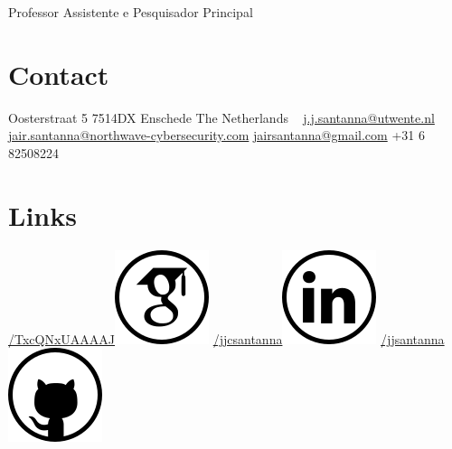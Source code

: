 \documentclass[print]{styles/friggeri-cv-mac} %
\begin{document}
{Professor Assistente e Pesquisador Principal} 
\begin{aside} 
 \section{Contact}
 Oosterstraat 5
 7514DX Enschede
 The Netherlands
~
\href{mailto:j.j.santanna@utwente.nl}{j.j.santanna@utwente.nl}
\href{mailto:jair.santanna@northwave-cybersecurity.com}{jair.santanna@northwave-cybersecurity.com}
\href{mailto:jairsantanna@gmail.com}{jairsantanna@gmail.com}
+31 6 82508224
~
\section{Links}\hspace{-1cm}
\hspace{-0.5cm}
\href{https://scholar.google.com/citations?user=TxcQNxUAAAAJ}{/TxcQNxUAAAAJ}\includegraphics[scale=0.3]{img/googlescholar.png}
\href{https://www.linkedin.com/in/jjcsantanna}{/jjcsantanna}\includegraphics[scale=0.3]{img/linkedin.png}
\href{https://github.com/jjsantanna}{/jjsantanna\includegraphics[scale=0.3]{img/github.png}}
~

\end{aside}
\end{document}
